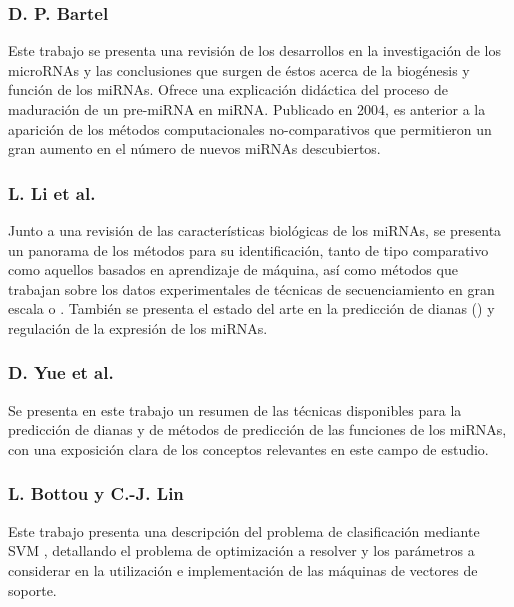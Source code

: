 \documentclass[12pt,bibliography=oldstyle,DIV=12,parskip=half-]{scrartcl}
\begin{document}
\subsubsection*{D. P. Bartel \cite{bartel116}}
Este trabajo se presenta una revisión de los desarrollos en la
investigación de los microRNAs y las conclusiones que surgen de éstos
acerca de la biogénesis y función de los miRNAs.  Ofrece una
explicación didáctica del proceso de maduración de un pre-miRNA en
miRNA.  Publicado en 2004, es anterior a la aparición de los métodos
computacionales no-comparativos que permitieron un gran aumento en el
número de nuevos miRNAs descubiertos.
%
\subsubsection*{L. Li et al. \cite{lili}}
Junto a una revisión de las características biológicas de los miRNAs,
se presenta un panorama de los métodos para su identificación, tanto
de tipo comparativo como aquellos basados en aprendizaje de máquina,
así como métodos que trabajan sobre los datos experimentales de
técnicas de secuenciamiento en gran escala o .
También se presenta el estado del arte en la predicción de dianas
() y regulación de la expresión de los miRNAs.
%
\subsubsection*{D. Yue et al. \cite{yue}}
Se presenta en este trabajo un resumen de las técnicas disponibles
para la predicción de dianas y de métodos de predicción de las
funciones de los miRNAs, con una exposición clara de los conceptos
relevantes en este campo de estudio.
%
\subsubsection*{L. Bottou y C.-J. Lin \cite{bottou}}
Este trabajo presenta una descripción del problema de clasificación
mediante SVM \cite{svm}, detallando el problema de optimización a
resolver y los parámetros a considerar en la utilización e
implementación de las máquinas de vectores de soporte.
%
%
\end{document}
